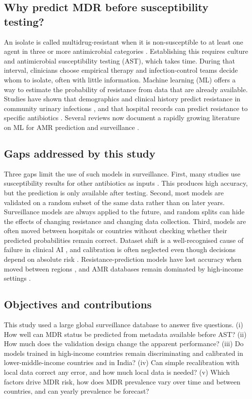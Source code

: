 \documentclass[11pt,a4paper]{article}
\begin{document}
\subsection{Why predict MDR before susceptibility testing?}
An isolate is called multidrug-resistant when it is non-susceptible to at least one agent in three or more antimicrobial categories \cite{magiorakos2012}. Establishing this requires culture and antimicrobial susceptibility testing (AST), which takes time. During that interval, clinicians choose empirical therapy and infection-control teams decide whom to isolate, often with little information. Machine learning (ML) offers a way to estimate the probability of resistance from data that are already available. Studies have shown that demographics and clinical history predict resistance in community urinary infections \cite{yelin2019}, and that hospital records can predict resistance to specific antibiotics \cite{lewinepstein2021}. Several reviews now document a rapidly growing literature on ML for AMR prediction and surveillance \cite{kim2022,ardila2025,latif2026}.

\subsection{Gaps addressed by this study}
Three gaps limit the use of such models in surveillance. First, many studies use susceptibility results for other antibiotics as inputs \cite{valavarasu2025,wishal2026}. This produces high accuracy, but the prediction is only available after testing. Second, most models are validated on a random subset of the same data rather than on later years. Surveillance models are always applied to the future, and random splits can hide the effects of changing resistance and changing data collection. Third, models are often moved between hospitals or countries without checking whether their predicted probabilities remain correct. Dataset shift is a well-recognised cause of failure in clinical AI \cite{finlayson2021,wong2021}, and calibration is often neglected even though decisions depend on absolute risk \cite{vancalster2019}. Resistance-prediction models have lost accuracy when moved between regions \cite{nsubuga2024}, and AMR databases remain dominated by high-income settings \cite{centner2026}.

\subsection{Objectives and contributions}
This study used a large global surveillance database to answer five questions. (i) How well can MDR status be predicted from metadata available before AST? (ii) How much does the validation design change the apparent performance? (iii) Do models trained in high-income countries remain discriminating and calibrated in lower-middle-income countries and in India? (iv) Can simple recalibration with local data correct any error, and how much local data is needed? (v) Which factors drive MDR risk, how does MDR prevalence vary over time and between countries, and can yearly prevalence be forecast?
\end{document}
